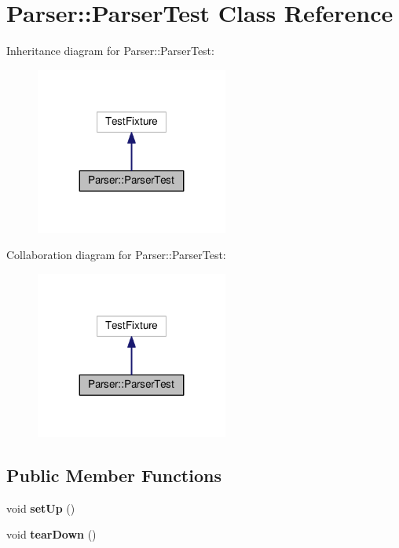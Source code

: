\hypertarget{class_parser_1_1_parser_test}{}\section{Parser\+:\+:Parser\+Test Class Reference}
\label{class_parser_1_1_parser_test}


Inheritance diagram for Parser\+:\+:Parser\+Test\+:
\nopagebreak
\begin{figure}[H]
\begin{center}
\leavevmode
\includegraphics[width=179pt]{class_parser_1_1_parser_test__inherit__graph}
\end{center}
\end{figure}


Collaboration diagram for Parser\+:\+:Parser\+Test\+:
\nopagebreak
\begin{figure}[H]
\begin{center}
\leavevmode
\includegraphics[width=179pt]{class_parser_1_1_parser_test__coll__graph}
\end{center}
\end{figure}
\subsection*{Public Member Functions}
\begin{DoxyCompactItemize}
\item 
void {\bfseries set\+Up} ()\hypertarget{class_parser_1_1_parser_test_ad371c6d0d9cc1093002f30f2829fd13a}{}\label{class_parser_1_1_parser_test_ad371c6d0d9cc1093002f30f2829fd13a}

\item 
void {\bfseries tear\+Down} ()\hypertarget{class_parser_1_1_parser_test_a500f9c38b4ce0decb9a0179f885561f3}{}\label{class_parser_1_1_parser_test_a500f9c38b4ce0decb9a0179f885561f3}

\end{DoxyCompactItemize}
